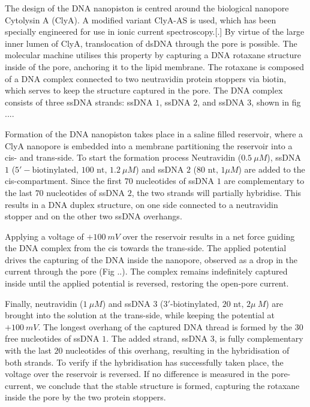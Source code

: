The design of the DNA nanopiston is centred around the biological nanopore Cytolysin
A (ClyA). A modified variant ClyA-AS is used, which has been specially engineered for
use in ionic current spectroscopy.[.] By virtue of the large inner lumen of ClyA,
translocation of dsDNA through the pore is possible. The molecular machine utilises this
property by capturing a DNA rotaxane structure inside of the pore, anchoring it to the
lipid membrane. The rotaxane is composed of a DNA complex connected to two neutravidin
protein stoppers via biotin, which serves to keep the structure captured in the pore. The
DNA complex consists of three ssDNA strands: ssDNA $1$, ssDNA $2$, and ssDNA $3$, shown
in fig ....

Formation of the DNA nanopiston takes place in a saline filled reservoir, where a
ClyA nanopore is embedded into a membrane partitioning the reservoir into a cis- and
trans-side. To start the formation process Neutravidin ($0.5\ \mu M$), ssDNA $1$
($5′-\text{biotinylated, }100\text{ nt, }1.2\ \mu M$) and ssDNA $2$ ($80\text{ nt, }1
\mu M$) are added to the cis-compartment. Since the first $70$ nucleotides of ssDNA $1$
are complementary to the last $70$ nucleotides of ssDNA $2$, the two strands will
partially hybridise. This results in a DNA duplex structure, on one side connected to a
neutravidin stopper and on the other two ssDNA overhangs.

Applying a voltage of $+100\ mV$ over the reservoir results in a net force guiding the
DNA complex from the cis towards the trans-side. The applied potential drives the
capturing of the DNA inside the nanopore, observed as a drop in the current through the
pore (Fig ..). The complex remains indefinitely captured inside until the
applied potential is reversed, restoring the open-pore current.

Finally, neutravidin ($1\ \mu M$) and ssDNA $3$ ($3\text{′-biotinylated, }20\text{ nt, }2
\mu\ M$) are brought into the solution at the trans-side, while keeping the potential at
$+ 100\ mV$. The longest overhang of the captured DNA thread is formed by the 30 free
nucleotides of ssDNA $1$. The added strand, ssDNA $3$, is fully complementary with the
last $20$ nucleotides of this overhang, resulting in the hybridisation of both strands.
To verify if the hybridisation has successfully taken place, the voltage over the
reservoir is reversed. If no difference is measured in the pore-current, we conclude that
the stable structure is formed, capturing the rotaxane inside the pore by the two protein
stoppers.

